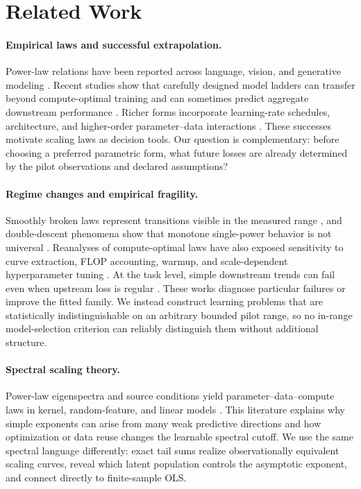 \section{Related Work}

\paragraph{Empirical laws and successful extrapolation.}
Power-law relations have been reported across language, vision, and generative modeling \citep{hestness2017deep,rosenfeld2020constructive,kaplan2020scaling,henighan2020scaling,hoffmann2022empirical}. Recent studies show that carefully designed model ladders can transfer beyond compute-optimal training and can sometimes predict aggregate downstream performance \citep{gadre2025reliable,ruan2024observational}. Richer forms incorporate learning-rate schedules, architecture, and higher-order parameter--data interactions \citep{tissue2024annealing,li2025farseer,mcleish2025gemstones}. These successes motivate scaling laws as decision tools. Our question is complementary: before choosing a preferred parametric form, what future losses are already determined by the pilot observations and declared assumptions?

\paragraph{Regime changes and empirical fragility.}
Smoothly broken laws represent transitions visible in the measured range \citep{caballero2022broken}, and double-descent phenomena show that monotone single-power behavior is not universal \citep{nakkiran2020deep}. Reanalyses of compute-optimal laws have also exposed sensitivity to curve extraction, FLOP accounting, warmup, and scale-dependent hyperparameter tuning \citep{besiroglu2024chinchilla,porian2024resolving}. At the task level, simple downstream trends can fail even when upstream loss is regular \citep{lourie2025unreliable}. These works diagnose particular failures or improve the fitted family. We instead construct learning problems that are statistically indistinguishable on an arbitrary bounded pilot range, so no in-range model-selection criterion can reliably distinguish them without additional structure.

\paragraph{Spectral scaling theory.}
Power-law eigenspectra and source conditions yield parameter--data--compute laws in kernel, random-feature, and linear models \citep{lin2024scaling,bordelon2024dynamical,lin2025improved}. This literature explains why simple exponents can arise from many weak predictive directions and how optimization or data reuse changes the learnable spectral cutoff. We use the same spectral language differently: exact tail sums realize observationally equivalent scaling curves, reveal which latent population controls the asymptotic exponent, and connect directly to finite-sample OLS.

